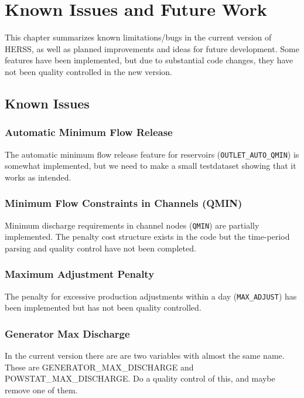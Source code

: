 \documentclass[a4paper, 12pt]{report}
\begin{document}
	
	\chapter{Known Issues and Future Work}
	\label{chap:future}
	This chapter summarizes known limitations/bugs in the current version of HERSS,
	as well as planned improvements and ideas for future development. Some features have been implemented, but due to substantial code changes, they have not been quality controlled in the new version. 
	

	\section{Known Issues}


	\subsection{Automatic Minimum Flow Release}
	The automatic minimum flow release feature for reservoirs
	(\texttt{OUTLET\_AUTO\_QMIN}) is somewhat implemented, but we need to make a small testdataset showing that it works as intended.

	\subsection{Minimum Flow Constraints in Channels (QMIN)}
	Minimum discharge requirements in channel nodes (\texttt{QMIN}) are partially
	implemented. The penalty cost structure exists in the code but the
	time-period parsing and quality control have not been completed.


	\subsection{Maximum Adjustment Penalty}
	The penalty for excessive production adjustments within a day
	(\texttt{MAX\_ADJUST}) has been implemented but has not been quality
	controlled. 


	\subsection{Generator Max Discharge}
	In the current version there are are two variables with almost the same name. These are GENERATOR\_MAX\_DISCHARGE and POWSTAT\_MAX\_DISCHARGE. Do a quality control of this, and maybe remove one of them. 
\end{document}
